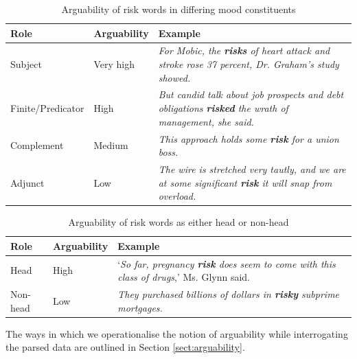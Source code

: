     \begin{table}
    \centering
    \footnotesize
    \begin{tabularx}{.70\textwidth}{|L{.5}|L{.5}|X|}%
    \hline
    \textbf{Role}              & \textbf{Arguability} & \textbf{Example} \\ \hline
    Subject           & Very high   & \emph{For Mobic, the \textbf{risks} of heart attack and stroke rose 37 percent, Dr. Graham's study showed.}       \\ \hline
    Finite\slash Predicator & High        & \emph{But candid talk about job prospects and debt obligations \textbf{risked} the wrath of management, she said.}       \\ \hline
    Complement        & Medium      & \emph{This approach holds some \textbf{risk} for a union boss.}       \\ \hline
    Adjunct           & Low         & \emph{The wire is stretched very tautly, and we are at some significant \textbf{risk} it will snap from overload.}       \\ \hline
    \end{tabularx}
    \caption{Arguability of risk words in differing mood constituents}
    \end{table}

    \begin{table}
    \centering
    \footnotesize
    \begin{tabularx}{.70\textwidth}{|L{.5}|L{.5}|X|}%
    \hline
    \textbf{Role}              & \textbf{Arguability} & \textbf{Example} \\ \hline
    Head           & High   & `\emph{So far, pregnancy \textbf{risk} does seem to come with this class of drugs},' Ms. Glynn said.       \\ \hline
    Non-head   & Low   & \emph{They purchased billions of dollars in \textbf{risky} subprime mortgages.}       \\ \hline
    \end{tabularx}
    \caption{Arguability of risk words as either head or non-head}
    \end{table}

        The ways in which we operationalise the notion of arguability while interrogating the parsed data are outlined in Section \ref{sect:arguability}.

		

